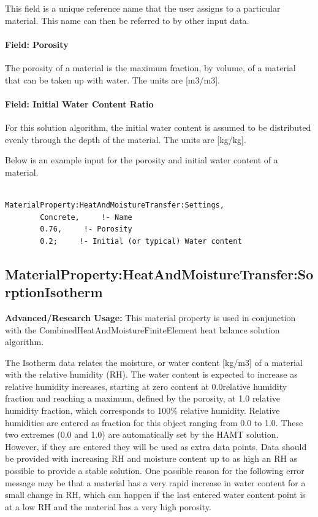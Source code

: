 This field is a unique reference name that the user assigns to a particular material. This name can then be referred to by other input data.

\paragraph{Field: Porosity}\label{field-porosity}

The porosity of a material is the maximum fraction, by volume, of a material that can be taken up with water. The units are {[}m3/m3{]}.

\paragraph{Field: Initial Water Content Ratio}\label{field-initial-water-content-ratio}

For this solution algorithm, the initial water content is assumed to be distributed evenly through the depth of the material. The units are {[}kg/kg{]}.

Below is an example input for the porosity and initial water content of a material.

\begin{lstlisting}

MaterialProperty:HeatAndMoistureTransfer:Settings,
        Concrete,     !- Name
        0.76,     !- Porosity
        0.2;     !- Initial (or typical) Water content
\end{lstlisting}

\subsection{MaterialProperty:HeatAndMoistureTransfer:SorptionIsotherm}\label{materialpropertyheatandmoisturetransfersorptionisotherm}

\textbf{Advanced/Research Usage:} This material property is used in conjunction with the CombinedHeatAndMoistureFiniteElement heat balance solution algorithm.

The Isotherm data relates the moisture, or water content {[}kg/m3{]} of a material with the relative humidity (RH). The water content is expected to increase as relative humidity increases, starting at zero content at 0.0relative humidity fraction and reaching a maximum, defined by the porosity, at 1.0 relative humidity fraction, which corresponds to 100\% relative humidity. Relative humidities are entered as fraction for this object ranging from 0.0 to 1.0. These two extremes (0.0 and 1.0) are automatically set by the HAMT solution. However, if they are entered they will be used as extra data points. Data should be provided with increasing RH and moisture content up to as high an RH as possible to provide a stable solution. One possible reason for the following error message may be that a material has a very rapid increase in water content for a small change in RH, which can happen if the last entered water content point is at a low RH and the material has a very high porosity.

